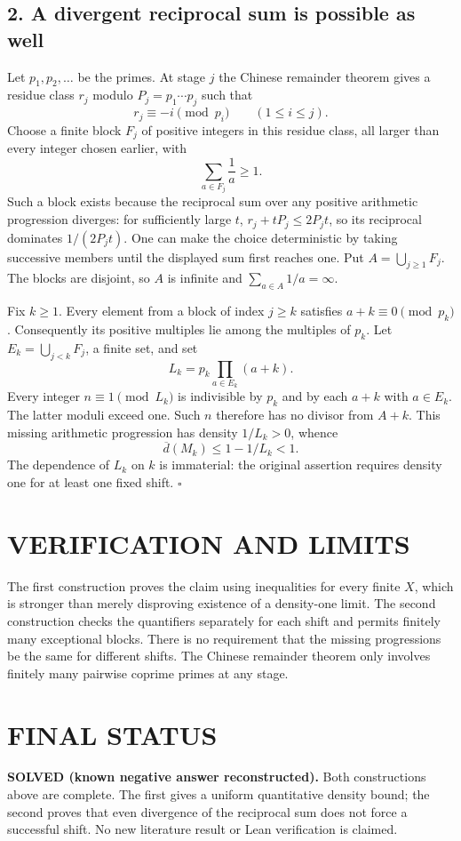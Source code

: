 \subsection{2. A divergent reciprocal sum is possible as well}
Let $p_1,p_2,\ldots$ be the primes. At stage $j$ the Chinese remainder
theorem gives a residue class $r_j$ modulo $P_j=p_1\cdots p_j$ such that
\[
 r_j\equiv-i\pmod{p_i}\qquad(1\leq i\leq j).
\]
Choose a finite block $F_j$ of positive integers in this residue class,
all larger than every integer chosen earlier, with
\[
 \sum_{a\in F_j}\frac1a\geq1.
\]
Such a block exists because the reciprocal sum over any positive
arithmetic progression diverges: for sufficiently large $t$,
$r_j+tP_j\leq2P_jt$, so its reciprocal dominates $1/(2P_jt)$.
One can make the choice deterministic by taking successive members
until the displayed sum first reaches one. Put $A=\bigcup_{j\geq1}F_j$.
The blocks are disjoint, so $A$ is infinite and $\sum_{a\in A}1/a=\infty$.

Fix $k\geq1$. Every element from a block of index $j\geq k$ satisfies
$a+k\equiv0\pmod{p_k}$. Consequently its positive multiples lie among
the multiples of $p_k$. Let $E_k=\bigcup_{j<k}F_j$, a finite set, and set
\[
 L_k=p_k\prod_{a\in E_k}(a+k).
\]
Every integer $n\equiv1\pmod{L_k}$ is indivisible by $p_k$ and by each
$a+k$ with $a\in E_k$. The latter moduli exceed one. Such $n$ therefore
has no divisor from $A+k$. This missing arithmetic progression has
density $1/L_k>0$, whence
\[
 \overline d(M_k)\leq1-1/L_k<1.
\]
The dependence of $L_k$ on $k$ is immaterial: the original assertion
requires density one for at least one fixed shift. \hfill$\square$

\section{VERIFICATION AND LIMITS}
The first construction proves the claim using inequalities for every
finite $X$, which is stronger than merely disproving existence of a
density-one limit. The second construction checks the quantifiers
separately for each shift and permits finitely many exceptional blocks.
There is no requirement that the missing progressions be the same for
different shifts. The Chinese remainder theorem only involves finitely
many pairwise coprime primes at any stage.

\section{FINAL STATUS}
\textbf{SOLVED (known negative answer reconstructed).}
Both constructions above are complete. The first gives a uniform
quantitative density bound; the second proves that even divergence of
the reciprocal sum does not force a successful shift. No new literature
result or Lean verification is claimed.

